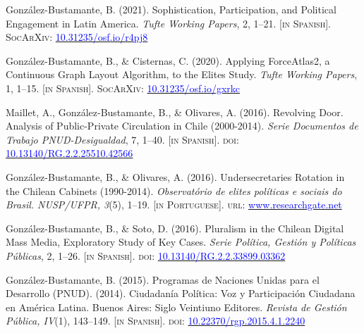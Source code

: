 \begin{publications}

\begin{benumerate}{6}
\item{\small Gonz\'alez-Bustamante, B. (2021). Sophistication, Participation, and Political Engagement in Latin America. {\itshape Tufte Working Papers}, 2, 1--21. {\footnotesize \scshape [in Spanish]}. {\scshape \footnotesize SocArXiv}: \href{https://doi.org/10.31235/osf.io/r4pj8}{\textcolor{blue}{10.31235/osf.io/r4pj8}}}\vspace{1mm}

\item{\small Gonz\'alez-Bustamante, B., \& Cisternas, C. (2020).  Applying ForceAtlas2, a Continuous Graph Layout Algorithm, to the Elites Study. {\itshape Tufte Working Papers}, 1, 1--15. {\footnotesize \scshape [in Spanish]}. {\scshape \footnotesize SocArXiv}: \href{https://doi.org/10.31235/osf.io/gxrkc}{\textcolor{blue}{10.31235/osf.io/gxrkc}}}\vspace{1mm}

\item{\small Maillet, A., Gonz\'alez-Bustamante, B., \& Olivares, A. (2016). Revolving Door. Analysis of Public-Private Circulation in Chile (2000-2014). {\itshape Serie Documentos de Trabajo PNUD-Desigualdad}, 7, 1--40. {\footnotesize \scshape [in Spanish]}. {\scshape doi}: \href{http://doi.org/10.13140/RG.2.2.25510.42566}{\textcolor{blue}{10.13140/RG.2.2.25510.42566}}}\vspace{1mm}

\item{\small Gonz\'alez-Bustamante, B., \& Olivares, A. (2016). Undersecretaries Rotation in the Chilean Cabinets (1990-2014). {\itshape Observat\'orio de elites pol\'iticas e sociais do Brasil. NUSP/UFPR, 3}(5), 1--19. {\footnotesize \scshape [in Portuguese]}. {\scshape url}: \href{https://www.researchgate.net/publication/321993740_A_rotatividade_de_subsecretarios_dos_ministerios_no_Chile_1990-2014}{\textcolor{blue}{www.researchgate.net}}}\vspace{1mm}

\item{\small Gonz\'alez-Bustamante, B., \& Soto, D. (2016). Pluralism in the Chilean Digital Mass Media, Exploratory Study of Key Cases. {\itshape Serie Pol\'itica, Gesti\'on y Pol\'iticas P\'ublicas}, 2, 1--26. {\footnotesize \scshape [in Spanish]}. {\scshape doi}: \href{http://doi.org/10.13140/RG.2.2.33899.03362}{\textcolor{blue}{10.13140/RG.2.2.33899.03362}}}\vspace{1mm}

\item{\small Gonz\'alez-Bustamante, B. (2015). Programas de Naciones Unidas para el Desarrollo (PNUD). (2014). Ciudadanía Política: Voz y Participación Ciudadana en América Latina. Buenos Aires: Siglo Veintiuno Editores. {\itshape Revista de Gestión Pública, IV}(1), 143--149. {\footnotesize \scshape [in Spanish]}. {\scshape doi}: \href{https://doi.org/10.22370/rgp.2015.4.1.2240}{\textcolor{blue}{10.22370/rgp.2015.4.1.2240}}}
\end{benumerate}

\end{publications}
